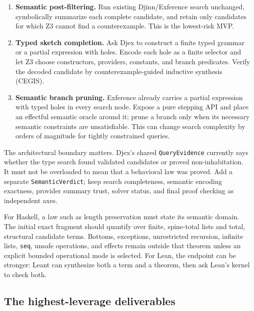 \documentclass[11pt,oneside]{article}
\newcommand{\code}[1]{\texttt{#1}}
\begin{document}
\begin{enumerate}
  \item \textbf{Semantic post-filtering.} Run existing Djinn/Exference search unchanged,
        symbolically summarize each complete candidate, and retain only candidates for
        which Z3 cannot find a counterexample. This is the lowest-risk MVP.
  \item \textbf{Typed sketch completion.} Ask Djex to construct a finite typed grammar
        or a partial expression with holes. Encode each hole as a finite selector and
        let Z3 choose constructors, providers, constants, and branch predicates. Verify
        the decoded candidate by counterexample-guided inductive synthesis (CEGIS).
  \item \textbf{Semantic branch pruning.} Exference already carries a partial expression
        with typed holes in every search node. Expose a pure stepping API and place an
        effectful semantic oracle around it; prune a branch only when its necessary
        semantic constraints are unsatisfiable. This can change search complexity by
        orders of magnitude for tightly constrained queries.
\end{enumerate}

The architectural boundary matters. Djex's shared \code{QueryEvidence} currently says
whether the type search found validated candidates or proved non-inhabitation. It must
not be overloaded to mean that a behavioral law was proved. Add a separate
\code{SemanticVerdict}; keep search completeness, semantic encoding exactness, provider
summary trust, solver status, and final proof checking as independent axes.

For Haskell, a law such as length preservation must state its semantic domain. The
initial exact fragment should quantify over finite, spine-total lists and total,
structural candidate terms. Bottoms, exceptions, unrestricted recursion, infinite
lists, \code{seq}, unsafe operations, and effects remain outside that theorem unless an
explicit bounded operational mode is selected. For Lean, the endpoint can be stronger:
Leant can synthesize both a term and a theorem, then ask Lean's kernel to check both.

\subsection*{The highest-leverage deliverables}
\end{document}
